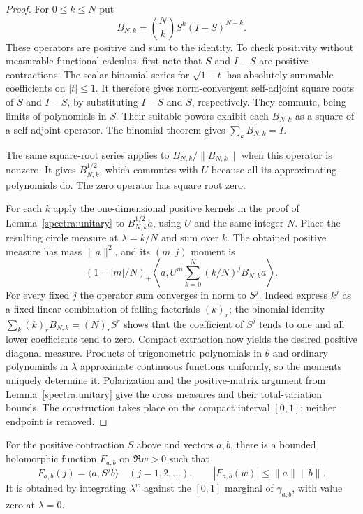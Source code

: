 \begin{proof}
For $0\le k\le N$ put
\[
 B_{N,k}=\binom Nk S^k(I-S)^{N-k}.
\]
These operators are positive and sum to the identity.  To check
positivity without measurable functional calculus, first note that
$S$ and $I-S$ are positive contractions.  The scalar binomial series
for $\sqrt{1-t}$ has absolutely summable coefficients on $|t|\le1$.
It therefore gives norm-convergent self-adjoint square roots of $S$
and $I-S$, by substituting $I-S$ and $S$, respectively.  They commute,
being limits of polynomials in $S$.  Their suitable powers exhibit
each $B_{N,k}$ as a square of a self-adjoint operator.  The binomial
theorem gives $\sum_k B_{N,k}=I$.

The same square-root series applies to $B_{N,k}/\|B_{N,k}\|$ when
this operator is nonzero.  It gives $B_{N,k}^{1/2}$, which commutes
with $U$ because all its approximating polynomials do.  The zero
operator has square root zero.

For each $k$ apply the one-dimensional positive kernels in the proof
of Lemma~\ref{spectra:unitary} to $B_{N,k}^{1/2}a$, using $U$ and
the same integer $N$.  Place the resulting circle measure at
$\lambda=k/N$ and sum over $k$.  The obtained positive measure has
mass $\|a\|^2$, and its $(m,j)$ moment is
\[
 (1-|m|/N)_+
 \left\langle a,U^m\sum_{k=0}^N(k/N)^jB_{N,k}a\right\rangle.
\]
For every fixed $j$ the operator sum converges in norm to $S^j$.
Indeed express $k^j$ as a fixed linear combination of falling
factorials $(k)_r$; the binomial identity
$\sum_k(k)_rB_{N,k}=(N)_rS^r$ shows that the coefficient of $S^j$
tends to one and all lower coefficients tend to zero.
Compact extraction now yields the desired positive diagonal measure.
Products of trigonometric polynomials in $\theta$ and ordinary
polynomials in $\lambda$ approximate continuous functions uniformly,
so the moments uniquely determine it.  Polarization and the
positive-matrix argument from Lemma~\ref{spectra:unitary} give the
cross measures and their total-variation bounds.  The construction
takes place on the compact interval $[0,1]$; neither endpoint is removed.
\end{proof}

\begin{corollary}\label{spectra:analytic}
For the positive contraction $S$ above and vectors $a,b$, there is a
bounded holomorphic function $F_{a,b}$ on $\Re w>0$ such that
\[
 F_{a,b}(j)=\langle a,S^jb\rangle\quad(j=1,2,\ldots),
 \qquad |F_{a,b}(w)|\le\|a\|\|b\|.
\]
It is obtained by integrating $\lambda^w$ against the $[0,1]$
marginal of $\gamma_{a,b}$, with value zero at $\lambda=0$.
\end{corollary}

